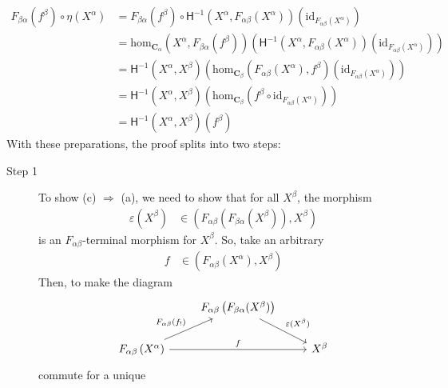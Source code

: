\begin{prf}
\begin{align*}
  F_{\beta\alpha}(f^{\beta})
  \circ
  \eta(X^{\alpha})
  &=
  F_{\beta\alpha}(f^{\beta})
  \circ
  \mathsf{H}^{-1}
  \left(
    X^{\alpha},
    F_{\alpha\beta}(X^{\alpha})
  \right)
  \left(
    \mathrm{id}_{F_{\alpha\beta}(X^{\alpha})}
  \right)
  \\
  &=
  \mathrm{hom}_{\mathbf{C}_{\alpha}}
  \left(
    X^{\alpha},
    F_{\beta\alpha}(f^{\beta})
  \right)
  \left(
    \mathsf{H}^{-1}
    \left(
      X^{\alpha},
      F_{\alpha\beta}(X^{\alpha})
    \right)
    \left(
      \mathrm{id}_{F_{\alpha\beta}(X^{\alpha})}
    \right)
  \right)
  \\
  &=
  \mathsf{H}^{-1}
  \left(
    X^{\alpha},
    X^{\beta}
  \right)
  \left(
    \mathrm{hom}_{\mathbf{C}_{\beta}}
    \left(
      F_{\alpha\beta}(X^{\alpha}),
      f^{\beta}
    \right)
    \left(
      \mathrm{id}_{F_{\alpha\beta}(X^{\alpha})}
    \right)
  \right)
  \tag{NT}
  \\
  &=
  \mathsf{H}^{-1}
  \left(
    X^{\alpha},
    X^{\beta}
  \right)
  \left(
    \mathrm{hom}_{\mathbf{C}_{\beta}}
    \left(
      f^{\beta}
      \circ
      \mathrm{id}_{F_{\alpha\beta}(X^{\alpha})}
    \right)
  \right)
  \\
  &=
  \mathsf{H}^{-1}
  \left(
    X^{\alpha},
    X^{\beta}
  \right)
  (f^{\beta})
\end{align*}
With these preparations, the proof splits into two steps:
\begin{description}
\item[Step 1]
To show {\glqq}(c) $\Rightarrow$ (a){\grqq}, we need to show that for all $X^{\beta}$, the morphism
\begin{align*}
  \varepsilon(X^{\beta})
  &\in
  \left(
    F_{\alpha\beta}(F_{\beta\alpha}(X^{\beta})),
    X^{\beta}
  \right)
\end{align*}
is an $F_{\alpha\beta}$-terminal morphism for $X^{\beta}$.
So, take an arbitrary 
\begin{align*}
  f
  &\in
  \left(
    F_{\alpha\beta}
    \left(
      X^{\alpha}
    \right),
    X^{\beta}
  \right)
\end{align*}
Then, to make the diagram
\[
\begin{tikzcd}[sep=normal]
  &
  F_{\alpha\beta}
  \left(
    F_{\beta\alpha}(X^{\beta})
  \right)
  \arrow{dr}{\varepsilon(X^{\beta})}
  &
  \\
  F_{\alpha\beta}
  \left(
    X^{\alpha}
  \right)
  \arrow{ur}{F_{\alpha\beta}(f_{!})}
  \arrow{rr}{f}
  &
  &
  X^{\beta}
\end{tikzcd}
\]
commute for a unique

\end{description}
\end{prf}
